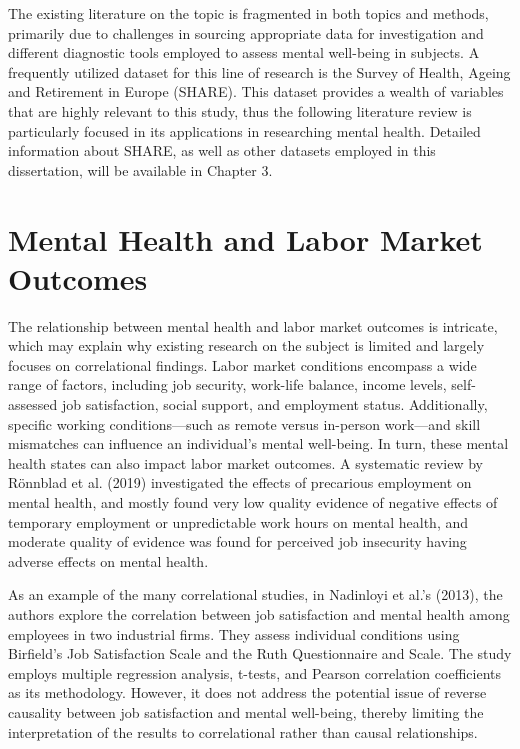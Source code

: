 The existing literature on the topic is fragmented in both topics and methods, primarily due to challenges in sourcing appropriate data for investigation and different diagnostic tools employed to assess mental well-being in subjects. 
A frequently utilized dataset for this line of research is the Survey of Health, Ageing and Retirement in Europe (SHARE). This dataset provides a wealth of variables that are highly relevant to this study, thus the following literature review is particularly focused in its applications in researching mental health. Detailed information about SHARE, as well as other datasets employed in this dissertation, will be available in Chapter 3.




\section{Mental Health and Labor Market Outcomes}
    The relationship between mental health and labor market outcomes is intricate, which may explain why existing research on the subject is limited and largely focuses on correlational findings. Labor market conditions encompass a wide range of factors, including job security, work-life balance, income levels, self-assessed job satisfaction, social support, and employment status. Additionally, specific working conditions—such as remote versus in-person work—and skill mismatches can influence an individual's mental well-being. In turn, these mental health states can also impact labor market outcomes. A systematic review by Rönnblad et al. (2019) investigated the effects of precarious employment on mental health, and mostly found very low quality evidence of negative effects of temporary employment or unpredictable work hours on mental health, and moderate quality of evidence was found for perceived job insecurity having adverse effects on mental health. 

    As an example of the many correlational studies, in Nadinloyi et al.'s (2013), the authors explore the correlation between job satisfaction and mental health among employees in two industrial firms. They assess individual conditions using Birfield's Job Satisfaction Scale and the Ruth Questionnaire and Scale. The study employs multiple regression analysis, t-tests, and Pearson correlation coefficients as its methodology. However, it does not address the potential issue of reverse causality between job satisfaction and mental well-being, thereby limiting the interpretation of the results to correlational rather than causal relationships. 

